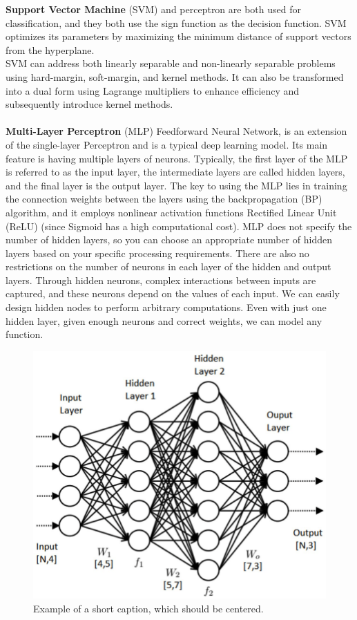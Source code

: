 \documentclass[10pt,twocolumn,letterpaper]{article}
\begin{document}
\noindent\textbf{Support Vector Machine} (SVM) and perceptron are both used for classification, and they both use the sign function as the decision function. SVM optimizes its parameters by maximizing the minimum distance of support vectors from the hyperplane\cite{suthaharan2016support}.\\
\indent SVM can address both linearly separable and non-linearly separable problems using hard-margin, soft-margin, and kernel methods. It can also be transformed into a dual form using Lagrange multipliers to enhance efficiency and subsequently introduce kernel methods\cite{suthaharan2016support}.\\
\\
\noindent\textbf{Multi-Layer Perceptron} (MLP) \wrt Feedforward Neural Network, is an extension of the single-layer Perceptron and is a typical deep learning model. Its main feature is having multiple layers of neurons. Typically, the first layer of the MLP is referred to as the input layer, the intermediate layers are called hidden layers, and the final layer is the output layer. The key to using the MLP lies in training the connection weights between the layers using the backpropagation\cite{werbos1990backpropagation} (BP) algorithm, and it employs nonlinear activation functions \eg Rectified Linear Unit\cite{glorot2011deep} (ReLU) (since Sigmoid has a high computational cost).
\indent MLP does not specify the number of hidden layers, so you can choose an appropriate number of hidden layers based on your specific processing requirements. There are also no restrictions on the number of neurons in each layer of the hidden and output layers. Through hidden neurons, complex interactions between inputs are captured, and these neurons depend on the values of each input. We can easily design hidden nodes to perform arbitrary computations. Even with just one hidden layer, given enough neurons and correct weights, we can model any function.
\begin{figure}[h]
	\centering
	\includegraphics[width=\columnwidth]{mlp}
	\caption{Example of a short caption, which should be centered.}
	\label{fig:mlp}
\end{figure}
\end{document}
